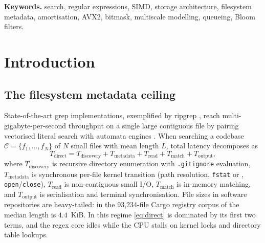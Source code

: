 \documentclass[11pt,letterpaper]{article}
\begin{document}
\vspace{0.6em}
\noindent\textbf{Keywords.} search, regular expressions, SIMD, storage
architecture, filesystem metadata, amortisation, AVX2, bitmask, multiscale
modelling, queueing, Bloom filters.
\vspace{0.8em}

\section{Introduction}
\label{sec:intro}

\subsection{The filesystem metadata ceiling}
State-of-the-art grep implementations, exemplified by ripgrep
\cite{ripgrep}, reach multi-gigabyte-per-second throughput on a single large
contiguous file by pairing vectorised literal search \cite{qiu2021teddy,
hyperscan} with automata engines \cite{regexautomata}. When searching a
codebase $\mathcal{C}=\{f_1,\dots,f_N\}$ of $N$ small files with mean length
$\bar{L}$, total latency decomposes as
\begin{equation}
\label{eq:direct}
T_{\text{direct}} = T_{\text{discovery}} + T_{\text{metadata}}
  + T_{\text{read}} + T_{\text{match}} + T_{\text{output}} ,
\end{equation}
where $T_{\text{discovery}}$ is recursive directory enumeration with
\texttt{.gitignore} evaluation, $T_{\text{metadata}}$ is synchronous
per-file kernel transition (path resolution, \texttt{fstat} or
, \texttt{open}/\texttt{close}),
$T_{\text{read}}$ is non-contiguous small I/O, $T_{\text{match}}$ is in-memory
matching, and $T_{\text{output}}$ is serialisation and terminal
synchronisation. File sizes in software repositories are heavy-tailed: in the
93{,}234-file Cargo registry corpus of  the
median length is $4.4$~KiB. In this regime \eqref{eq:direct} is dominated by
its first two terms, and the regex core idles while the CPU stalls on kernel
locks and directory table lookups.
\end{document}
